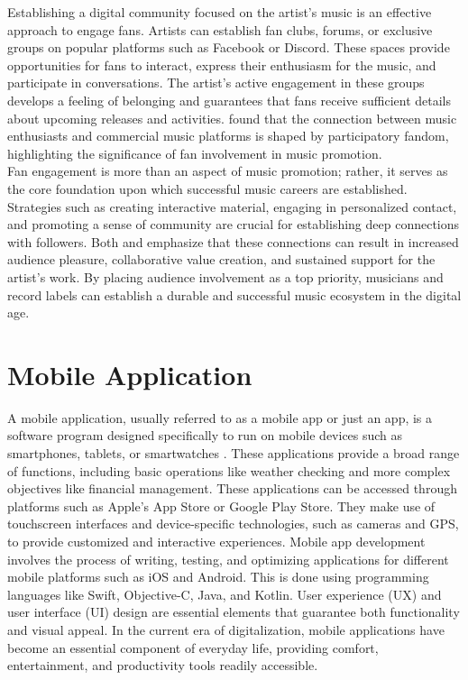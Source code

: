 Establishing a digital community focused on the artist's music is an effective approach to engage fans. Artists can establish fan clubs, forums, or exclusive groups on popular platforms such as Facebook or Discord. These spaces provide opportunities for fans to interact, express their enthusiasm for the music, and participate in conversations. The artist's active engagement in these groups develops a feeling of belonging and guarantees that fans receive sufficient details about upcoming releases and activities. \textcite{lee20} found that the connection between music enthusiasts and commercial music platforms is shaped by participatory fandom, highlighting the significance of fan involvement in music promotion. \\

Fan engagement is more than an aspect of music promotion; rather, it serves as the core foundation upon which successful music careers are established. Strategies such as creating interactive material, engaging in personalized contact, and promoting a sense of community are crucial for establishing deep connections with followers. Both \textcite{edlom21} and \textcite{lee20} emphasize that these connections can result in increased audience pleasure, collaborative value creation, and sustained support for the artist's work. By placing audience involvement as a top priority, musicians and record labels can establish a durable and successful music ecosystem in the digital age. \pagebreak

\section{Mobile Application}
A mobile application, usually referred to as a mobile app or just an app, is a software program designed specifically to run on mobile devices such as smartphones, tablets, or smartwatches \parencite{ramdurai21}. These applications provide a broad range of functions, including basic operations like weather checking and more complex objectives like financial management. These applications can be accessed through platforms such as Apple's App Store or Google Play Store. They make use of touchscreen interfaces and device-specific technologies, such as cameras and GPS, to provide customized and interactive experiences. Mobile app development involves the process of writing, testing, and optimizing applications for different mobile platforms such as iOS and Android. This is done using programming languages like Swift, Objective-C, Java, and Kotlin. User experience (UX) and user interface (UI) design are essential elements that guarantee both functionality and visual appeal. In the current era of digitalization, mobile applications have become an essential component of everyday life, providing comfort, entertainment, and productivity tools readily accessible.

